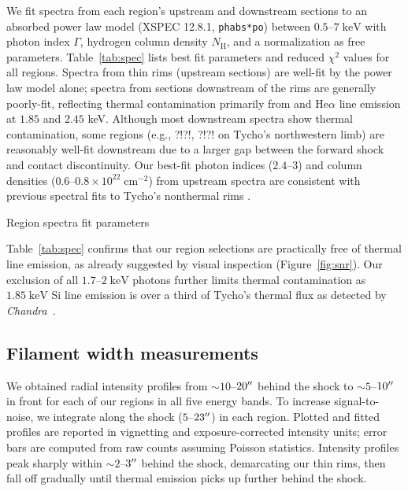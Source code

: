 \documentclass[iop, apj, numberedappendix, twocolappendix]{emulateapj}
\newcommand*{\mt}{\mathrm}
\newcommand*{\unit}[1]{\;\mt{#1}}  %
\newcommand*{\abt}{\mathord{\sim}} %
\newcommand*{\Chandra}{\textit{Chandra}\ }
\begin{document}
We fit spectra from each region's upstream and downstream sections to an
absorbed power law model (XSPEC 12.8.1, \texttt{phabs*po}) between $0.5$--$7
\unit{keV}$ with photon index $\Gamma$, hydrogen column density $N_{\mt{H}}$,
and a normalization as free parameters.  Table~\ref{tab:spec} lists best fit
parameters and reduced $\chi^2$ values for all regions.  Spectra from thin rims
(upstream sections) are well-fit by the power law model alone; spectra from
sections downstream of the rims are generally poorly-fit, reflecting thermal
contamination primarily from  and  He$\alpha$ line
emission at $1.85$ and $2.45$ keV.  Although most downstream spectra show
thermal contamination, some regions (e.g., ?!?!, ?!?! on Tycho's northwestern limb)
are reasonably well-fit downstream due to a larger gap between the forward
shock and contact discontinuity.
Our best-fit photon indices ($2.4$--$3$) and column densities ($0.6$--$0.8
\times 10^{22} \unit{cm^{-2}}$) from upstream spectra are consistent with
previous spectral fits to Tycho's nonthermal rims \citep{hwang2002,
cassam-chenai2007}.

\begin{table}
    \scriptsize
    \centering
    \caption{Region spectra fit parameters\label{tab:spec}}
    
\end{table}

Table~\ref{tab:spec} confirms that our region selections are practically free
of thermal line emission, as already suggested by visual inspection
(Figure~\ref{fig:snr}).  Our exclusion of all $1.7$--$2 \unit{keV}$ photons
further limits thermal contamination as $1.85 \unit{keV}$ Si line emission is
over a third of Tycho's thermal flux as detected by \Chandra \citep{hwang2002}.

\subsection{Filament width measurements}
\label{sec:fwhms}

We obtained radial intensity profiles from $\abt 10$--$20\mbox{$^{\prime\prime}$}$ behind the
shock to $\abt 5$--$10\mbox{$^{\prime\prime}$}$ in front for each of our regions in all five
energy bands.  To increase signal-to-noise, we integrate along the shock
($5$--$23\mbox{$^{\prime\prime}$}$) in each region.  Plotted and fitted profiles are reported in
vignetting and exposure-corrected intensity units; error bars are computed from
raw counts assuming Poisson statistics.  Intensity profiles peak sharply
within $\abt 2$--$3\mbox{$^{\prime\prime}$}$ behind the shock, demarcating our thin rims,
then fall off gradually until thermal emission picks up further behind the
shock.
\end{document}
